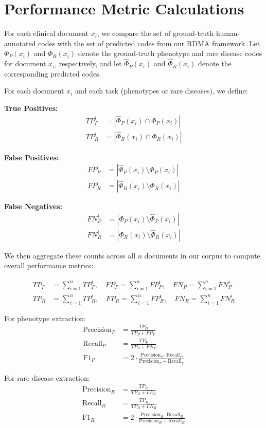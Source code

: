 \section*{Performance Metric Calculations}\label{appendix: Performance Metric Calculations}
For each clinical document $x_i$, we compare the set of ground-truth human-annotated codes with the set of predicted codes from our RDMA framework. Let $\Phi_P(x_i)$ and $\Phi_R(x_i)$ denote the ground-truth phenotype and rare disease codes for document $x_i$, respectively, and let $\hat{\Phi}_P(x_i)$ and $\hat{\Phi}_R(x_i)$ denote the corresponding predicted codes.

For each document $x_i$ and each task (phenotypes or rare diseases), we define:

\textbf{True Positives:}
\begin{align}
TP_P^i &= |\hat{\Phi}_P(x_i) \cap \Phi_P(x_i)| \\
TP_R^i &= |\hat{\Phi}_R(x_i) \cap \Phi_R(x_i)|
\end{align}

\textbf{False Positives:}
\begin{align}
FP_P^i &= |\hat{\Phi}_P(x_i) \setminus \Phi_P(x_i)| \\
FP_R^i &= |\hat{\Phi}_R(x_i) \setminus \Phi_R(x_i)|
\end{align}

\textbf{False Negatives:}
\begin{align}
FN_P^i &= |\Phi_P(x_i) \setminus \hat{\Phi}_P(x_i)| \\
FN_R^i &= |\Phi_R(x_i) \setminus \hat{\Phi}_R(x_i)|
\end{align}

We then aggregate these counts across all $n$ documents in our corpus to compute overall performance metrics:

\begin{align}
TP_P &= \sum_{i=1}^{n} TP_P^i, \quad FP_P = \sum_{i=1}^{n} FP_P^i, \quad FN_P = \sum_{i=1}^{n} FN_P^i \\
TP_R &= \sum_{i=1}^{n} TP_R^i, \quad FP_R = \sum_{i=1}^{n} FP_R^i, \quad FN_R = \sum_{i=1}^{n} FN_R^i
\end{align}

For phenotype extraction:
\begin{align}
\text{Precision}_P &= \frac{TP_P}{TP_P + FP_P} \\
\text{Recall}_P &= \frac{TP_P}{TP_P + FN_P} \\
\text{F1}_P &= 2 \cdot \frac{\text{Precision}_P \cdot \text{Recall}_P}{\text{Precision}_P + \text{Recall}_P}
\end{align}

For rare disease extraction:
\begin{align}
\text{Precision}_R &= \frac{TP_R}{TP_R + FP_R} \\
\text{Recall}_R &= \frac{TP_R}{TP_R + FN_R} \\
\text{F1}_R &= 2 \cdot \frac{\text{Precision}_R \cdot \text{Recall}_R}{\text{Precision}_R + \text{Recall}_R}
\end{align}

